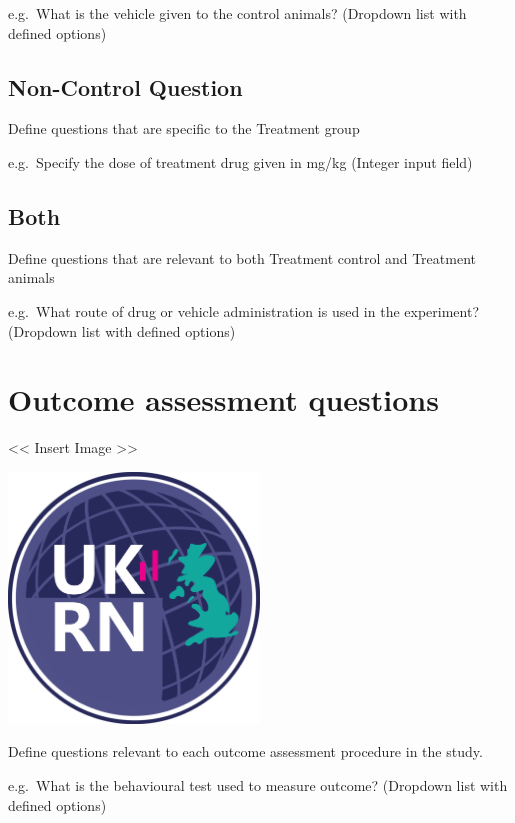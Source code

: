 \documentclass[
]{book}
\begin{document}
e.g.~What is the vehicle given to the control animals?
(Dropdown list with defined options)

\hypertarget{non-control-question-1}{%
\subsection{Non-Control Question}\label{non-control-question-1}}

Define questions that are specific to the Treatment group

e.g.~Specify the dose of treatment drug given in mg/kg
(Integer input field)

\hypertarget{both-1}{%
\subsection{Both}\label{both-1}}

Define questions that are relevant to both Treatment control and Treatment animals

e.g.~What route of drug or vehicle administration is used in the experiment?
(Dropdown list with defined options)

\hypertarget{outcome-assessment-questions}{%
\section{Outcome assessment questions}\label{outcome-assessment-questions}}

\textless{}\textless{} Insert Image \textgreater{}\textgreater{}

\includegraphics[width=0.5\textwidth,height=0.5\textheight]{figs/evidence-triangle.png}

Define questions relevant to each outcome assessment procedure in the study.

e.g.~What is the behavioural test used to measure outcome?
(Dropdown list with defined options)
\end{document}
